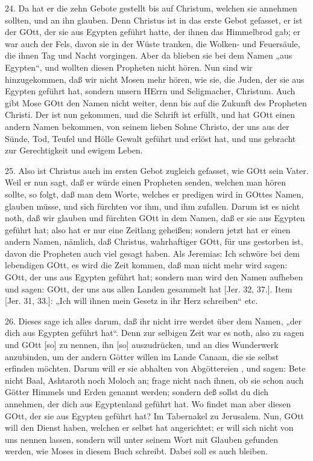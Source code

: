 24. Da hat er die zehn Gebote gestellt bis auf Christum, welchen sie annehmen sollten, und an ihn glauben. Denn Christus ist in das erste Gebot gefasset, er ist der GOtt, der sie aus Egypten geführt hatte, der ihnen das Himmelbrod gab; er war auch der Fels, davon sie in der Wüste tranken, die Wolken- und Feuersäule, die ihnen Tag und Nacht vorgingen. Aber da blieben sie bei dem Namen „aus Egypten“, und wollten diesen Propheten nicht hören. Nun sind wir hinzugekommen, daß wir nicht Mosen mehr hören, wie sie, die Juden, der sie aus Egypten geführt hat, sondern unsern HErrn und Seligmacher, Christum. Auch gibt Mose GOtt den Namen nicht weiter, denn bis auf die Zukunft des Propheten Christi. Der ist nun gekommen, und die Schrift ist erfüllt, und hat GOtt einen andern Namen bekommen, von seinem lieben Sohne Christo, der uns aus der Sünde, Tod, Teufel und Hölle Gewalt geführt und erlöst hat, und uns gebracht zur Gerechtigkeit und ewigem Leben.

25. Also ist Christus auch im ersten Gebot zugleich gefasset, wie GOtt sein Vater. Weil er nun sagt, daß er würde einen Propheten senden, welchen man hören sollte, so folgt, daß man dem Worte, welches er predigen wird in GOttes Namen, glauben müsse, und sich fürchten vor ihm, und ihm zufallen. Darum ist es nicht noth, daß wir glauben und fürchten GOtt in dem Namen, daß er sie aus Egypten geführt hat; also hat er nur eine Zeitlang geheißen; sondern jetzt hat er einen andern Namen, nämlich, daß Christus, wahrhaftiger GOtt, für uns gestorben ist, davon die Propheten auch viel gesagt haben. Als Jeremias: Ich schwöre bei dem lebendigen GOtt, es wird die Zeit kommen, daß man nicht mehr wird sagen: GOtt, der uns aus Egypten geführt hat; sondern man wird den Namen aufheben und sagen: GOtt, der uns aus allen Landen gesammelt hat [Jer. 32, 37.]. Item [Jer. 31, 33.]: „Ich will ihnen mein Gesetz in ihr Herz schreiben“ etc.

26. Dieses sage ich alles darum, daß ihr nicht irre werdet über dem Namen, „der dich aus Egypten geführt hat“. Denn zur selbigen Zeit war es noth, also zu sagen und GOtt [so] zu nennen, ihn [so] auszudrücken, und an dies Wunderwerk anzubinden, um der andern Götter willen im Lande Canaan, die sie selbst erfinden möchten. Darum will er sie abhalten von Abgöttereien
, und sagen: Bete nicht Baal, Ashtaroth noch Moloch an; frage nicht nach ihnen, ob sie schon auch Götter Himmels und Erden genannt werden; sondern deß sollst du dich annehmen, der dich aus Egyptenland geführt hat. Wo findet man aber diesen GOtt, der sie aus Egypten geführt hat? Im Tabernakel zu Jerusalem. Nun, GOtt will den Dienst haben, welchen er selbst hat angerichtet; er will sich nicht von uns nennen lassen, sondern will unter seinem Wort mit Glauben gefunden werden, wie Moses in diesem Buch schreibt. Dabei soll es auch bleiben.

